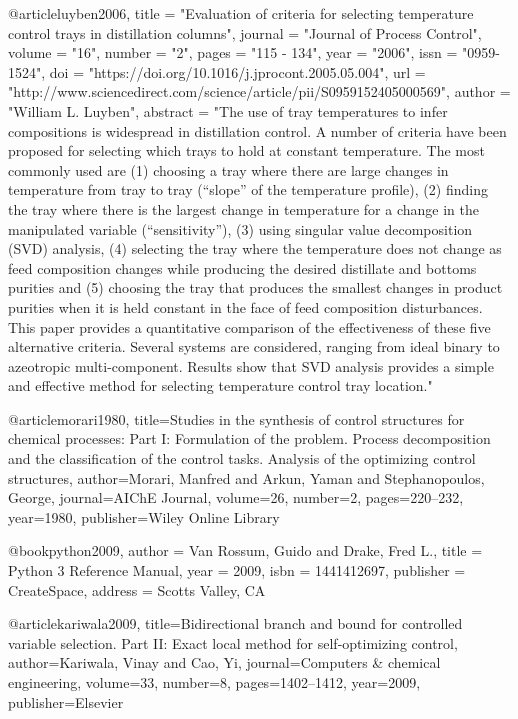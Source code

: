 @article{luyben2006,
title = "Evaluation of criteria for selecting temperature control trays in distillation columns",
journal = "Journal of Process Control",
volume = "16",
number = "2",
pages = "115 - 134",
year = "2006",
issn = "0959-1524",
doi = "https://doi.org/10.1016/j.jprocont.2005.05.004",
url = "http://www.sciencedirect.com/science/article/pii/S0959152405000569",
author = "William L. Luyben",
abstract = "The use of tray temperatures to infer compositions is widespread in distillation control. A number of criteria have been proposed for selecting which trays to hold at constant temperature. The most commonly used are (1) choosing a tray where there are large changes in temperature from tray to tray (“slope” of the temperature profile), (2) finding the tray where there is the largest change in temperature for a change in the manipulated variable (“sensitivity”), (3) using singular value decomposition (SVD) analysis, (4) selecting the tray where the temperature does not change as feed composition changes while producing the desired distillate and bottoms purities and (5) choosing the tray that produces the smallest changes in product purities when it is held constant in the face of feed composition disturbances. This paper provides a quantitative comparison of the effectiveness of these five alternative criteria. Several systems are considered, ranging from ideal binary to azeotropic multi-component. Results show that SVD analysis provides a simple and effective method for selecting temperature control tray location."
}

@article{morari1980,
  title={Studies in the synthesis of control structures for chemical processes: Part I: Formulation of the problem. Process decomposition and the classification of the control tasks. Analysis of the optimizing control structures},
  author={Morari, Manfred and Arkun, Yaman and Stephanopoulos, George},
  journal={AIChE Journal},
  volume={26},
  number={2},
  pages={220--232},
  year={1980},
  publisher={Wiley Online Library}
}

@book{python2009,
 author = {Van Rossum, Guido and Drake, Fred L.},
 title = {Python 3 Reference Manual},
 year = {2009},
 isbn = {1441412697},
 publisher = {CreateSpace},
 address = {Scotts Valley, CA}
}

@article{kariwala2009,
  title={Bidirectional branch and bound for controlled variable selection. Part II: Exact local method for self-optimizing control},
  author={Kariwala, Vinay and Cao, Yi},
  journal={Computers \& chemical engineering},
  volume={33},
  number={8},
  pages={1402--1412},
  year={2009},
  publisher={Elsevier}
}

